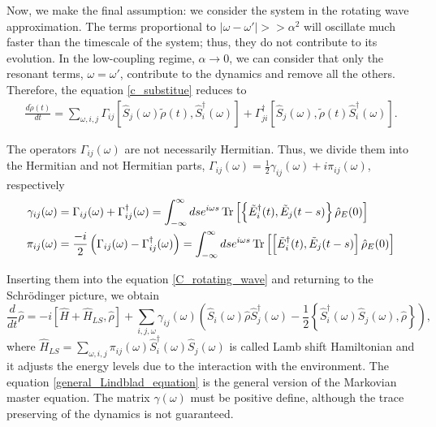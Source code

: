Now, we make the final assumption: we consider the system in the rotating wave approximation. The terms proportional to $|\omega-\omega'| >> \alpha^2$ will oscillate much faster than the timescale of the system; thus, they do not contribute to its evolution. In the low-coupling regime, $\alpha\rightarrow 0$, we can consider that only the resonant terms, $\omega=\omega'$, contribute to the dynamics and remove all the others. Therefore, the equation \eqref{c_substitue} reduces to
\begin{eqnarray}\label{C_rotating_wave}
    \frac{d\tilde\rho(t)}{dt} = \sum_{\omega,i,j}\Gamma_{ij}\left[\hat S_j(\omega)\tilde\rho(t),\hat S_i^\dagger(\omega)\right]+\Gamma_{ji}^\dagger\left[\hat S_j(\omega),\tilde\rho(t)\hat S_i^\dagger(\omega)\right].
\end{eqnarray}

The operators $\Gamma_{ij}(\omega)$ are not necessarily Hermitian. Thus, we divide them into the Hermitian and not Hermitian parts, $\Gamma_{ij}(\omega) =\frac{1}{2}\gamma_{ij}(\omega)+i\pi_{ij}(\omega)$, respectively
\begin{equation}
    \begin{split}
        \gamma_{ij}(\omega) &=   \Gamma_{ij}(\omega) + \Gamma_{ij}^\dagger(\omega) = \int_{-\infty}^\infty ds e^{i\omega s}\operatorname{Tr}\left[\left\{\tilde E_i^\dagger(t),\tilde E_j(t-s)\right\}\hat\rho_E(0)\right]\\
        \pi_{ij}(\omega) &= \frac{-i}{2}\left(\Gamma_{ij}(\omega)-\Gamma_{ij}^\dagger(\omega)\right)=\int_{-\infty}^\infty ds e^{i\omega s}\operatorname{Tr}\left[\left[\tilde E_i^\dagger(t),\tilde E_j(t-s)\right]\hat\rho_E(0)\right]\\
    \end{split}
\end{equation}

Inserting them into the equation \eqref{C_rotating_wave} and returning to the Schrödinger picture, we obtain
\begin{equation}\label{general_Lindblad_equation}
    \frac{d}{dt}\hat\rho = -i\left[\hat H + \hat H_{LS},\hat\rho\right] + \sum_{i,j,\omega} \gamma_{ij}(\omega) \left(\hat S_i(\omega) \hat\rho \hat S^\dagger_j(\omega) - \frac{1}{2}\left\{ \hat S^\dagger_i(\omega)\hat S_j(\omega), \hat\rho\right\} \right),
\end{equation}
where $\hat H_{LS} = \sum_{\omega,i,j} \pi_{ij}(\omega)\hat S^\dagger_i(\omega)\hat S_j(\omega)$ is called Lamb shift Hamiltonian and it adjusts the energy levels due to the interaction with the environment. The equation \eqref{general_Lindblad_equation} is the general version of the Markovian master equation. The matrix $\gamma(\omega)$ must be positive define, although the trace preserving of the dynamics is not guaranteed.

